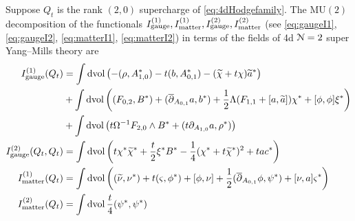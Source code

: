 \documentclass[10pt, oneside]{article}
\newcommand{\MU}{\mathrm{MU}}
\begin{document}
\begin{prop}
\label{4d_donaldson_susy_prop}
Suppose $Q_t$ is the rank $(2,0)$ supercharge of \ref{eq:4dHodgefamily}.
The $\MU(2)$ decomposition of the functionals $I_{\rm gauge}^{(1)}, I^{(1)}_{\rm matter}, I^{(2)}_{\rm gauge}, I^{(2)}_{\rm matter}$ (see \eqref{eq:gaugeI1},  \eqref{eq:gaugeI2}, \eqref{eq:matterI1}, \eqref{eq:matterI2}) in terms of the fields of 4d $\mathcal N=2$ super Yang--Mills theory are
\begin{align*}
I_{\rm gauge}^{(1)}(Q_t) &= \int \operatorname{dvol}\left(-(\rho, A_{1, 0}^*) - t(b, A_{0, 1}^*) - (\widetilde{\chi} + t\chi)\widetilde{a}^*\right) \\
& + \int\operatorname{dvol}\left((F_{0, 2}, B^*) + (\overline{\partial}_{A_{0, 1}}a, b^*) + \frac{1}{2}\Lambda(F_{1, 1}  + [a, \widetilde{a}])\chi^* + [\phi, \phi]\xi^* \right) \\
&+ \int\operatorname{dvol}\left( t\Omega^{-1} F_{2, 0}\wedge B^* + (t\partial_{A_{1, 0}} a, \rho^*)\right) \\
I^{(2)}_{\rm gauge} (Q_t, Q_t) &= \int \operatorname{dvol} \left(t\chi^*\widetilde{\chi}^* + \frac{t}{2} \xi^* B^* -\frac{1}{4}(\chi^* + t\widetilde{\chi}^*)^2 + t a c^*\right) \\
I_{\rm matter}^{(1)}(Q_t) &= \int \operatorname{dvol} \left((\widetilde{\nu}, \nu^*) + t (\varsigma, \phi^*) + [\phi, \nu] + \frac{1}{2} (\overline{\partial}_{A_{0,1}} \phi, \psi^*) + [\nu, a]\varsigma^* \right) \\
I_{\rm matter}^{(2)}(Q_t) &= \int \operatorname{dvol} \frac t4  (\psi^*, \psi^*)
\end{align*}
\end{prop}

\end{document}
